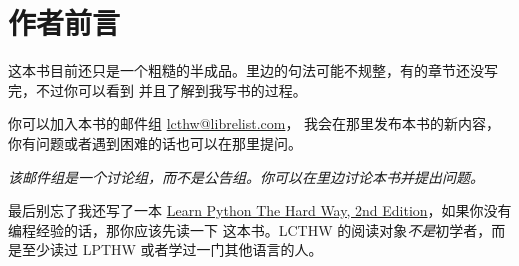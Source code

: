 \chapter*{作者前言}

这本书目前还只是一个粗糙的半成品。里边的句法可能不规整，有的章节还没写完，不过你可以看到
并且了解到我写书的过程。

你可以加入本书的邮件组 \href{mailto:lcthw@librelist.com}{lcthw@librelist.com}，
我会在那里发布本书的新内容，你有问题或者遇到困难的话也可以在那里提问。

\emph{该邮件组是一个讨论组，而不是公告组。你可以在里边讨论本书并提出问题。}

最后别忘了我还写了一本 \href{http://learnpythonthehardway.org}{Learn
Python The Hard Way, 2nd Edition}，如果你没有编程经验的话，那你应该先读一下
这本书。LCTHW 的阅读对象\emph{不是}初学者，而是至少读过 LPTHW 或者学过一门其他语言的人。
